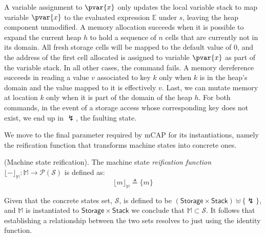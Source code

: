 A variable assignment to $\pvar{x}$ only updates the local variable stack to map variable $\pvar{x}$ to the evaluated expression $\mathds{E}$ under $s$, leaving the heap component unmodified. A memory allocation succeeds when it is possible to expand the current heap $h$ to hold a sequence of $n$ cells that are currently not in its domain. All fresh storage cells will be mapped to the default value of $0$, and the address of the first cell allocated is assigned to variable $\pvar{x}$ as part of the variable stack. In all other cases, the command fails. A memory dereference succeeds in reading a value $v$ associated to key $k$ only when $k$ is in the heap's domain and the value mapped to it is effectively $v$. Last, we can mutate memory at location $k$ only when it is part of the domain of the heap $h$. For both commands, in the event of a storage access whose corresponding key does not exist, we end up in $\lightning$, the faulting state.

We move to the final parameter required by mCAP for its instantiations, namely the reification function that transforms machine states into concrete ones.
\begin{defn}
	(Machine state reification).
	The machine state \emph{reification function} $\lfloor - \rfloor_\mathbb{M} : \mathbb{M} \rightarrow \mathcal{P}(\mathcal{S})$ is defined as:
	\[
		\lfloor m \rfloor_\mathbb{M} \triangleq \{ m \}
	\]
\end{defn}

Given that the concrete states set, $\mathcal{S}$, is defined to be $(\mathsf{Storage} \times \mathsf{Stack}) \uplus \{\lightning\}$, and $\mathbb{M}$ is instantiated to $\mathsf{Storage} \times \mathsf{Stack}$ we conclude that $\mathbb{M} \subset \mathcal{S}$. It follows that establishing a relationship between the two sets resolves to just using the identity function.